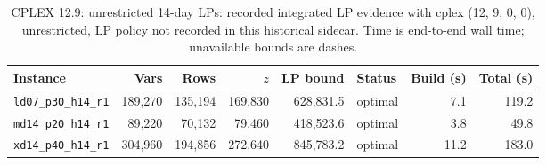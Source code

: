 \begin{table}[htbp]
\centering\scriptsize
\caption{CPLEX 12.9: unrestricted 14-day LPs: recorded integrated LP evidence with cplex (12, 9, 0, 0), unrestricted, LP policy not recorded in this historical sidecar. Time is end-to-end wall time; unavailable bounds are dashes.}
\label{tab:validated_lp_1}
\label{tab:step4_long_family_lp}
\begin{tabular}{lrrrrlrr}
\toprule
Instance & Vars & Rows & $z$ & LP bound & Status & Build (s) & Total (s) \\
\midrule
\texttt{ld07\_p30\_h14\_r1} & 189,270 & 135,194 & 169,830 & 628,831.5 & optimal & 7.1 & 119.2 \\
\texttt{md14\_p20\_h14\_r1} & 89,220 & 70,132 & 79,460 & 418,523.6 & optimal & 3.8 & 49.8 \\
\texttt{xd14\_p40\_h14\_r1} & 304,960 & 194,856 & 272,640 & 845,783.2 & optimal & 11.2 & 183.0 \\
\bottomrule
\end{tabular}
\end{table}
